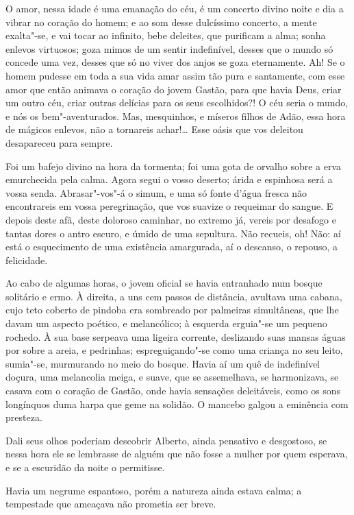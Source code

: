 O amor, nessa idade é uma emanação do céu, é um concerto divino noite e
dia a vibrar no coração do homem; e ao som desse dulcíssimo concerto, a
mente exalta"-se, e vai tocar ao infinito, bebe deleites, que purificam a
alma; sonha enlevos virtuosos; goza mimos de um sentir indefinível,
desses que o mundo só concede uma vez, desses que só no viver dos anjos
se goza eternamente. Ah! Se o homem pudesse em toda a sua vida amar
assim tão pura e santamente, com esse amor que então animava o coração
do jovem Gastão, para que havia Deus, criar um outro céu, criar outras
delícias para os seus escolhidos?! O céu seria o mundo, e nós os
bem"-aventurados. Mas, mesquinhos, e míseros filhos de Adão, essa hora de
mágicos enlevos, não a tornareis achar!\ldots{} Esse oásis que vos deleitou
desapareceu para sempre.

Foi um bafejo divino na hora da tormenta; foi uma gota de orvalho sobre
a erva emurchecida pela calma. Agora segui o vosso deserto; árida e
espinhosa será a vossa senda. Abrasar"-vos"-á o simum, e uma só fonte
d'água fresca não encontrareis em vossa peregrinação, que vos suavize o
requeimar do sangue. E depois deste afã, deste doloroso caminhar, no
extremo já, vereis por desafogo e tantas dores o antro escuro, e úmido
de uma sepultura. Não recueis, oh! Não: aí está o esquecimento de uma
existência amargurada, aí o descanso, o repouso, a felicidade.

Ao cabo de algumas horas, o jovem oficial se havia entranhado num bosque
solitário e ermo. À direita, a uns cem passos de distância, avultava uma
cabana, cujo teto coberto de pindoba era sombreado por palmeiras
simultâneas, que lhe davam um aspecto poético, e melancólico; à esquerda
erguia"-se um pequeno rochedo. À sua base serpeava uma ligeira corrente,
deslizando suas mansas águas por sobre a areia, e pedrinhas;
espreguiçando"-se como uma criança no seu leito, sumia"-se, murmurando no
meio do bosque. Havia aí um quê de indefinível doçura, uma melancolia
meiga, e suave, que se assemelhava, se harmonizava, se casava com o
coração de Gastão, onde havia sensações deleitáveis, como os sons
longínquos duma harpa que geme na solidão. O mancebo galgou a eminência
com presteza.

Dali seus olhos poderiam descobrir Alberto, ainda pensativo e
desgostoso, se nessa hora ele se lembrasse de alguém que não fosse a
mulher por quem esperava, e se a escuridão da noite o permitisse.

Havia um negrume espantoso, porém a natureza ainda estava calma; a
tempestade que ameaçava não prometia ser breve.

